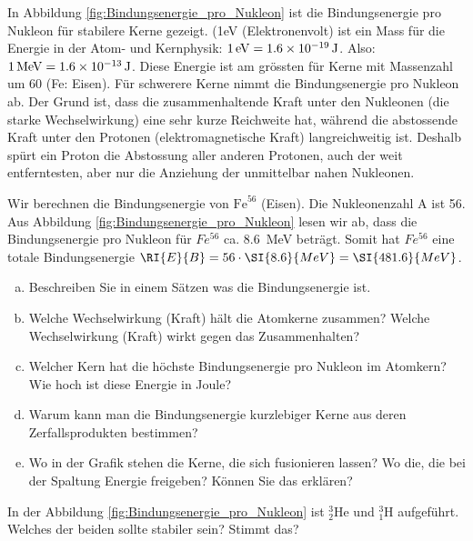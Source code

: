 \documentclass[12pt,a4paper,twoside]{article}
\begin{document}
In Abbildung \ref{fig:Bindungsenergie_pro_Nukleon} ist die Bindungsenergie pro Nukleon für stabilere Kerne gezeigt. 
(1eV (Elektronenvolt) ist ein Mass für die Energie in der Atom- und Kernphysik:
$\SI{1}{eV} = \SI{1.6E-19}{J}$. Also: $\SI{1}{MeV} = \SI{1.6E-13}{J}$.
Diese Energie ist am grössten für Kerne mit Massenzahl um 60 (Fe: Eisen).
Für schwerere Kerne nimmt die Bindungsenergie pro Nukleon ab. Der Grund ist,
dass die zusammenhaltende Kraft unter den Nukleonen (die starke Wechselwirkung) eine sehr kurze Reichweite hat,
während die abstossende Kraft unter den Protonen (elektromagnetische Kraft) langreichweitig ist.
Deshalb spürt ein Proton die Abstossung aller anderen Protonen, auch der weit entferntesten,
aber nur die Anziehung der unmittelbar nahen Nukleonen.

 


Wir berechnen die Bindungsenergie von $\text{Fe}^{56}$ (Eisen). 
Die Nukleonenzahl A ist 56. Aus Abbildung \ref{fig:Bindungsenergie_pro_Nukleon} lesen wir ab,
dass die Bindungsenergie pro Nukleon für $Fe^{56}$ ca. \SI{8.6}{MeV} beträgt. 
Somit hat $Fe^{56}$ eine totale Bindungsenergie $\RI{E}{B} = 56\cdot\SI{8.6}{MeV} = \SI{481.6}{MeV}$.




\begin{aufgabe}
	\begin{enumerate} [a)]
		\item Beschreiben Sie in einem Sätzen was die Bindungsenergie ist.
		\item Welche Wechselwirkung (Kraft) hält die Atomkerne zusammen? Welche Wechselwirkung (Kraft) wirkt gegen das Zusammenhalten?
		\item Welcher Kern hat die höchste Bindungsenergie pro Nukleon im Atomkern? Wie hoch ist diese Energie in Joule?
		\item Warum kann man die Bindungsenergie kurzlebiger Kerne aus deren Zerfallsprodukten bestimmen?
		\item Wo in der Grafik stehen die Kerne, die sich fusionieren lassen? Wo die, die bei der Spaltung Energie freigeben? Können Sie das erklären?
	\end{enumerate}
\end{aufgabe}

\begin{aufgabe}
	In der Abbildung \ref{fig:Bindungsenergie_pro_Nukleon} ist $^3_2\text{He}$ und $^3_1\text{H}$ aufgeführt. 
	Welches der beiden sollte stabiler sein? Stimmt das?
\end{aufgabe}
\end{document}
